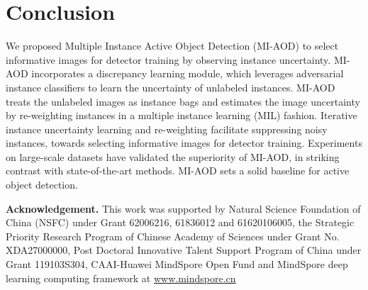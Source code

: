 \documentclass[final]{cvpr}
\begin{document}
\section{Conclusion}
We proposed Multiple Instance Active Object Detection (MI-AOD) to select informative images for detector training by observing instance uncertainty. MI-AOD incorporates a discrepancy learning module, which leverages adversarial instance classifiers to learn the uncertainty of unlabeled instances. MI-AOD treats the unlabeled images as instance bags and estimates the image uncertainty by re-weighting instances in a multiple instance learning (MIL) fashion. Iterative instance uncertainty learning and re-weighting facilitate suppressing noisy instances, towards selecting informative images for detector training. Experiments on large-scale datasets have validated the superiority of MI-AOD, in striking contrast with state-of-the-art methods. 
MI-AOD sets a solid baseline for active object detection.

\textbf{Acknowledgement.} This work was supported by Natural Science Foundation of China (NSFC) under Grant 62006216, 61836012 and 61620106005, the Strategic Priority Research Program of Chinese Academy of Sciences under Grant No. XDA27000000, Post Doctoral Innovative Talent Support Program of China under Grant 119103S304, CAAI-Huawei MindSpore Open Fund and MindSpore deep learning computing framework at \href{https://www.mindspore.cn}{www.mindspore.cn}

{\small


}
\end{document}
